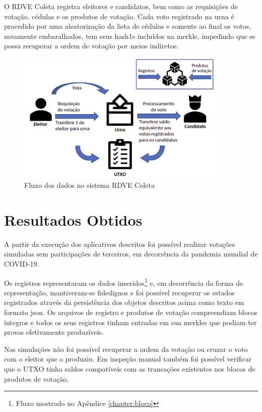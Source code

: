 O RDVE Coleta registra eleitores e candidatos, bem como as requisições de votação, cédulas e os produtos de votação. Cada voto registrado na urna é procedido por uma aleatorização da lista de cédulas e somente ao final os votos, novamente embaralhados, tem seus \glspl{hash1} incluídos na \gls{merkle}, impedindo que se possa recuperar a ordem de votação por meios indiretos. 

\clearpage

\begin{figure}[!h]
	\centering
	\includegraphics[width=0.9\textwidth]{imagens/fluxo_dados}
	\caption{Fluxo dos dados no sistema RDVE Coleta}
	\label{fig:fluxo_dados}
\end{figure}


\section{Resultados Obtidos}

A partir da execução dos aplicativos descritos foi possível realizar votações simuladas sem participações de terceiros, em decorrência da pandemia mundial de COVID-19.

Os registros representaram os dados inseridos\footnote{Fluxo mostrado no Apêndice \ref{chapter:bloco}} e, em decorrência da forma de representação, mantiveram-se fidedignos e foi possível recuperar os estados registrados através da persistência dos objetos descritos acima como texto em formato \gls{json}. Os arquivos de registro e produtos de votação compreendiam blocos íntegros e todos os seus registros tinham entradas em sua \glspl{merkle} que podiam ter provas efetivamente produzíveis. 

Nas simulações não foi possível recuperar a ordem da votação ou cruzar o voto com o eleitor que o produziu. Em inspeção manual também foi possível verificar que o UTXO tinha saldos compatíveis com as transações existentes nos blocos de produtos de votação. 